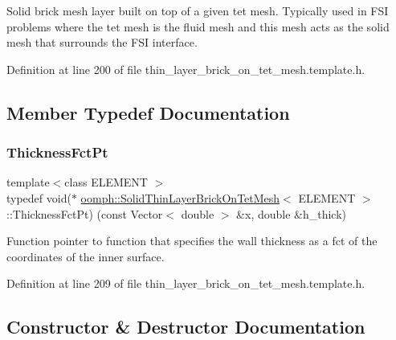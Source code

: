 Solid brick mesh layer built on top of a given tet mesh. Typically used in F\+SI problems where the tet mesh is the fluid mesh and this mesh acts as the solid mesh that surrounds the F\+SI interface. 

Definition at line 200 of file thin\+\_\+layer\+\_\+brick\+\_\+on\+\_\+tet\+\_\+mesh.\+template.\+h.



\subsection{Member Typedef Documentation}
\mbox{\label{classoomph_1_1SolidThinLayerBrickOnTetMesh_ae4289650b0c0eccb2fd3d661b85e85ee}} 
\subsubsection{\texorpdfstring{Thickness\+Fct\+Pt}{ThicknessFctPt}}
{\footnotesize\ttfamily template$<$class E\+L\+E\+M\+E\+NT $>$ \\
typedef void($\ast$ \hyperlink{classoomph_1_1SolidThinLayerBrickOnTetMesh}{oomph\+::\+Solid\+Thin\+Layer\+Brick\+On\+Tet\+Mesh}$<$ E\+L\+E\+M\+E\+NT $>$\+::Thickness\+Fct\+Pt) (const Vector$<$ double $>$ \&x, double \&h\+\_\+thick)}



Function pointer to function that specifies the wall thickness as a fct of the coordinates of the inner surface. 



Definition at line 209 of file thin\+\_\+layer\+\_\+brick\+\_\+on\+\_\+tet\+\_\+mesh.\+template.\+h.



\subsection{Constructor \& Destructor Documentation}
\mbox{\label{classoomph_1_1SolidThinLayerBrickOnTetMesh_ac06a05511ae55f0d554e940789661de1}} 
